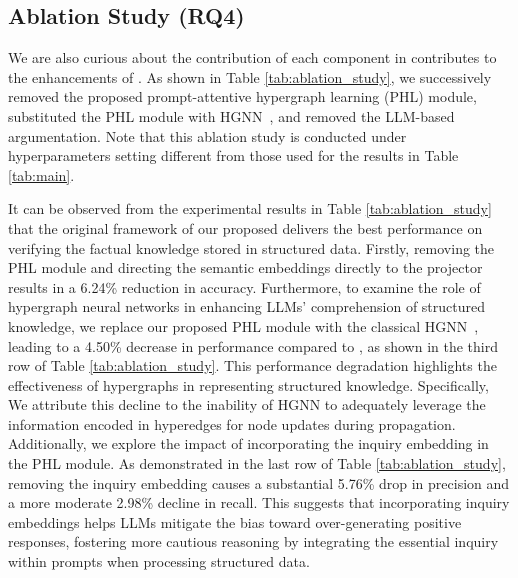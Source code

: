 {\subsection{Ablation Study (RQ4)}


We are also curious about the contribution of each component in \name contributes to the enhancements of \name. 
As shown in Table \ref{tab:ablation_study}, we successively removed the proposed prompt-attentive hypergraph learning (PHL) module, substituted the PHL module with HGNN~\cite{hgnn}, and removed the LLM-based argumentation. Note that this ablation study is conducted under hyperparameters setting different from those used for the results in Table \ref{tab:main}.

It can be observed from the experimental results in Table \ref{tab:ablation_study} that the original framework of our proposed \name delivers the best performance on verifying the factual knowledge stored in structured data. Firstly, removing the PHL module and directing the semantic embeddings directly to the projector results in a 6.24\% reduction in accuracy. Furthermore, to examine the role of hypergraph neural networks in enhancing LLMs' comprehension of structured knowledge, we replace our proposed PHL module with the classical HGNN~\cite{hgnn}, leading to a 4.50\% decrease in performance compared to \name, as shown in the third row of Table \ref{tab:ablation_study}. This performance degradation highlights the effectiveness of hypergraphs in representing structured knowledge. Specifically, We attribute this decline to the inability of HGNN to adequately leverage the information encoded in hyperedges for node updates during propagation. Additionally, we explore the impact of incorporating the inquiry embedding in the PHL module. As demonstrated in the last row of Table \ref{tab:ablation_study}, removing the inquiry embedding causes a substantial 5.76\% drop in precision and a more moderate 2.98\% decline in recall. This suggests that incorporating inquiry embeddings helps LLMs mitigate the bias toward over-generating positive responses, fostering more cautious reasoning by integrating the essential inquiry within prompts when processing structured data.

\vspace{-0.05in}
}
